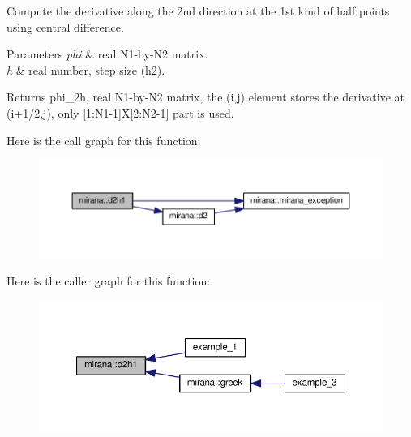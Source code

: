 Compute the derivative along the 2nd direction at the 1st kind of half points using central difference. 


\begin{DoxyParams}{Parameters}
{\em phi} & real N1-\/by-\/\-N2 matrix. \\
\hline
{\em h} & real number, step size (h2). \\
\hline
\end{DoxyParams}
\begin{DoxyReturn}{Returns}
phi\-\_\-2h, real N1-\/by-\/\-N2 matrix, the (i,j) element stores the derivative at (i+1/2,j), only \mbox{[}1\-:N1-\/1\mbox{]}X\mbox{[}2\-:N2-\/1\mbox{]} part is used. 
\end{DoxyReturn}


Here is the call graph for this function\-:\nopagebreak
\begin{figure}[H]
\begin{center}
\leavevmode
\includegraphics[width=350pt]{classmirana_a9341f957abd27c5132c557ae873055bd_cgraph}
\end{center}
\end{figure}




Here is the caller graph for this function\-:
\nopagebreak
\begin{figure}[H]
\begin{center}
\leavevmode
\includegraphics[width=350pt]{classmirana_a9341f957abd27c5132c557ae873055bd_icgraph}
\end{center}
\end{figure}


